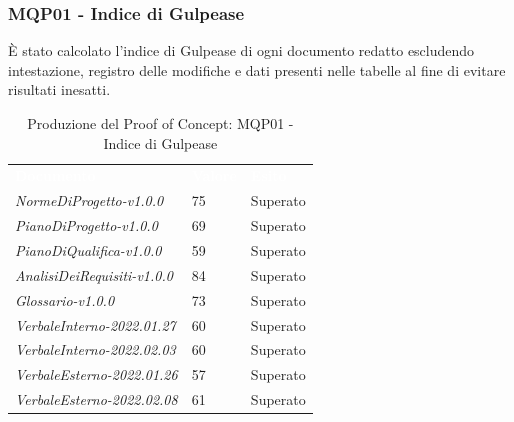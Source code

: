 \subsubsection{MQP01 - Indice di Gulpease}
È stato calcolato l'indice di Gulpease di ogni documento redatto escludendo intestazione, registro delle modifiche e dati presenti nelle tabelle al fine di evitare risultati inesatti.
\begin{table}[H]
        \renewcommand{\arraystretch}{1.5}
        \begin{tabular}{m{}<{\centering}  m{}<{\centering}  m{}<{\centering} }
            \rowcolor{darkblue}
            \textcolor{white}{\textbf{Documento}}& \textcolor{white}{\textbf{Valore}} & \textcolor{white}{\textbf{Esito}}\\ 

            \textit{NormeDiProgetto-v1.0.0} &
            75 &
            Superato \\

            \textit{PianoDiProgetto-v1.0.0} &
            69 &
            Superato \\

            \textit{PianoDiQualifica-v1.0.0} &
            59 &
            Superato \\

            \textit{AnalisiDeiRequisiti-v1.0.0} &
            84 &
            Superato \\
            
            \textit{Glossario-v1.0.0} &
            73 &
            Superato \\

            \textit{VerbaleInterno-2022.01.27} &
            60 &
            Superato \\
            
            \textit{VerbaleInterno-2022.02.03} &
            60 &
            Superato \\

            \textit{VerbaleEsterno-2022.01.26} &
            57&
            Superato \\

            \textit{VerbaleEsterno-2022.02.08} &
            61&
            Superato \\
    \end{tabular}
    \caption{Produzione del Proof of Concept: MQP01 - Indice di Gulpease}
\end{table}

